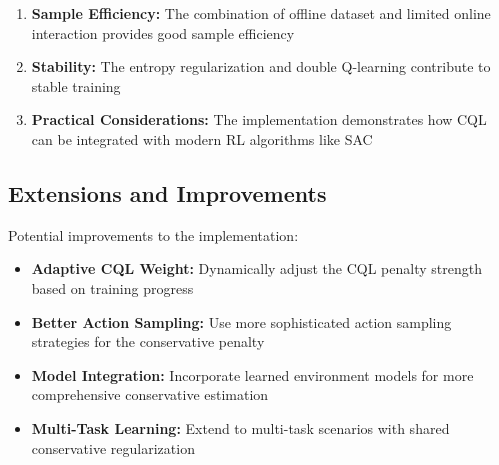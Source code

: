 \documentclass[12pt]{article}
\begin{document}
{{\begin{enumerate}
    \item \textbf{Sample Efficiency:} The combination of offline dataset and limited online interaction provides good sample efficiency
    
    \item \textbf{Stability:} The entropy regularization and double Q-learning contribute to stable training
    
    \item \textbf{Practical Considerations:} The implementation demonstrates how CQL can be integrated with modern RL algorithms like SAC
\end{enumerate}

\subsection{Extensions and Improvements}

Potential improvements to the implementation:
\begin{itemize}
    \item \textbf{Adaptive CQL Weight:} Dynamically adjust the CQL penalty strength based on training progress
    \item \textbf{Better Action Sampling:} Use more sophisticated action sampling strategies for the conservative penalty
    \item \textbf{Model Integration:} Incorporate learned environment models for more comprehensive conservative estimation
    \item \textbf{Multi-Task Learning:} Extend to multi-task scenarios with shared conservative regularization
\end{itemize}

}}


\newpage
\end{document}

